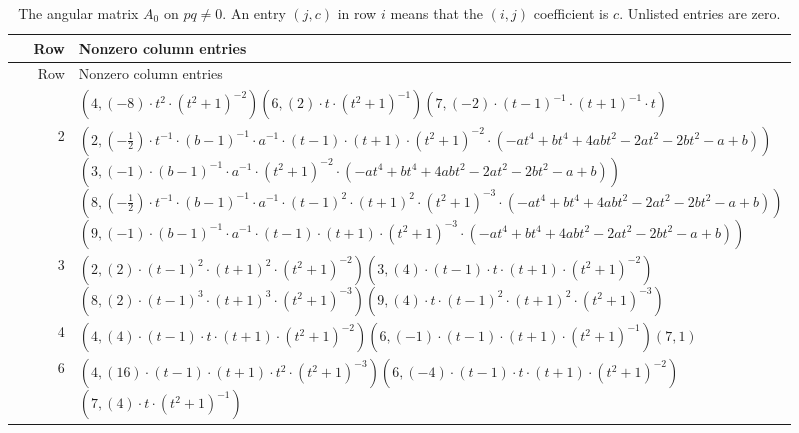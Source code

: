 \begingroup\small
\setlength{\tabcolsep}{3pt}
\renewcommand{\arraystretch}{1.16}
\begin{longtable}{@{}r>{\raggedright\arraybackslash}p{0.91\linewidth}@{}}
\caption{The angular matrix $A_0$ on $pq\ne0$. An entry $(j,c)$ in row $i$ means that the $(i,j)$ coefficient is $c$. Unlisted entries are zero.}\label{supp:matrix-A_general}\\
\toprule Row & Nonzero column entries\\\midrule\endfirsthead
\toprule Row & Nonzero column entries\\\midrule\endhead
\bottomrule\endfoot
1 & \((4,\left(-8\right) \cdot t^{2} \cdot (t^{2} + 1)^{-2})\)\allowbreak\quad \((6,\left(2\right) \cdot t \cdot (t^{2} + 1)^{-1})\)\allowbreak\quad \((7,\left(-2\right) \cdot (t - 1)^{-1} \cdot (t + 1)^{-1} \cdot t)\)\\
2 & \((2,\left(-\frac{1}{2}\right) \cdot t^{-1} \cdot (b - 1)^{-1} \cdot a^{-1} \cdot (t - 1) \cdot (t + 1) \cdot (t^{2} + 1)^{-2} \cdot (-a t^{4} + b t^{4} + 4 a b t^{2} - 2 a t^{2} - 2 b t^{2} - a + b))\)\allowbreak\quad \((3,\left(-1\right) \cdot (b - 1)^{-1} \cdot a^{-1} \cdot (t^{2} + 1)^{-2} \cdot (-a t^{4} + b t^{4} + 4 a b t^{2} - 2 a t^{2} - 2 b t^{2} - a + b))\)\allowbreak\quad \((8,\left(-\frac{1}{2}\right) \cdot t^{-1} \cdot (b - 1)^{-1} \cdot a^{-1} \cdot (t - 1)^{2} \cdot (t + 1)^{2} \cdot (t^{2} + 1)^{-3} \cdot (-a t^{4} + b t^{4} + 4 a b t^{2} - 2 a t^{2} - 2 b t^{2} - a + b))\)\allowbreak\quad \((9,\left(-1\right) \cdot (b - 1)^{-1} \cdot a^{-1} \cdot (t - 1) \cdot (t + 1) \cdot (t^{2} + 1)^{-3} \cdot (-a t^{4} + b t^{4} + 4 a b t^{2} - 2 a t^{2} - 2 b t^{2} - a + b))\)\\
3 & \((2,\left(2\right) \cdot (t - 1)^{2} \cdot (t + 1)^{2} \cdot (t^{2} + 1)^{-2})\)\allowbreak\quad \((3,\left(4\right) \cdot (t - 1) \cdot t \cdot (t + 1) \cdot (t^{2} + 1)^{-2})\)\allowbreak\quad \((8,\left(2\right) \cdot (t - 1)^{3} \cdot (t + 1)^{3} \cdot (t^{2} + 1)^{-3})\)\allowbreak\quad \((9,\left(4\right) \cdot t \cdot (t - 1)^{2} \cdot (t + 1)^{2} \cdot (t^{2} + 1)^{-3})\)\\
4 & \((4,\left(4\right) \cdot (t - 1) \cdot t \cdot (t + 1) \cdot (t^{2} + 1)^{-2})\)\allowbreak\quad \((6,\left(-1\right) \cdot (t - 1) \cdot (t + 1) \cdot (t^{2} + 1)^{-1})\)\allowbreak\quad \((7,1)\)\\
6 & \((4,\left(16\right) \cdot (t - 1) \cdot (t + 1) \cdot t^{2} \cdot (t^{2} + 1)^{-3})\)\allowbreak\quad \((6,\left(-4\right) \cdot (t - 1) \cdot t \cdot (t + 1) \cdot (t^{2} + 1)^{-2})\)\allowbreak\quad \((7,\left(4\right) \cdot t \cdot (t^{2} + 1)^{-1})\)\\

\end{longtable}
